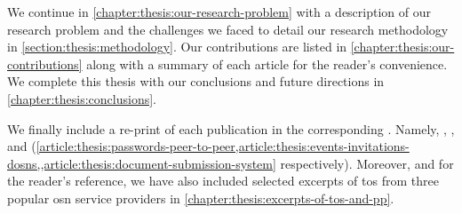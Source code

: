 We continue in \cref{chapter:thesis:our-research-problem} with a description of our research 
problem and the challenges we faced to detail our research methodology in \cref{section:thesis:methodology}. 
Our contributions are listed in \cref{chapter:thesis:our-contributions} along with 
a summary of each article for the reader's convenience. We complete this thesis 
with our conclusions and future directions in \cref{chapter:thesis:conclusions}.

We finally include a re-print of each publication in the corresponding . 
Namely, , , 
and  (\cref{article:thesis:passwords-peer-to-peer,article:thesis:events-invitations-dosns,,article:thesis:document-submission-system} 
respectively). Moreover, and for the reader's reference, we have also included selected 
excerpts of \ac{tos} from three popular \ac{osn} service providers in \cref{chapter:thesis:excerpts-of-tos-and-pp}.


